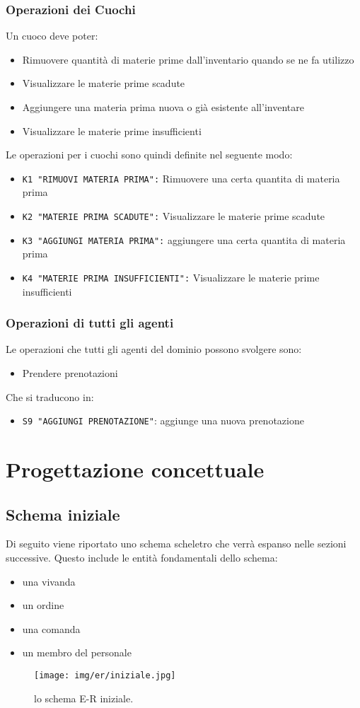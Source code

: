 \documentclass[a4paper,12pt]{report}
\begin{document}
\subsection{Operazioni dei Cuochi}\label{sec:cooks}
Un cuoco deve poter:
%
\begin{itemize}
    \item Rimuovere quantità di materie prime dall'inventario quando se ne fa utilizzo
    \item Visualizzare le materie prime scadute
    \item Aggiungere una materia prima nuova o già esistente all'inventare
    \item Visualizzare le materie prime insufficienti
\end{itemize}
Le operazioni per i cuochi sono quindi definite nel seguente modo:
%
\begin{itemize}
    \item\texttt{K1 "RIMUOVI MATERIA PRIMA":} Rimuovere una certa quantita di materia prima
    \item\texttt{K2 "MATERIE PRIMA SCADUTE":} Visualizzare le materie prime scadute
    \item\texttt{K3 "AGGIUNGI MATERIA PRIMA":} aggiungere una certa quantita di materia prima
    \item\texttt{K4 "MATERIE PRIMA INSUFFICIENTI":} Visualizzare le materie prime insufficienti
\end{itemize}
%
\subsection{Operazioni di tutti gli agenti}\label{sec:everyone_ops}
Le operazioni che tutti gli agenti del dominio possono svolgere sono: 
\begin{itemize}
    \item Prendere prenotazioni
\end{itemize}
Che si traducono in:
\begin{itemize}
    \item \texttt{S9 "AGGIUNGI PRENOTAZIONE"}: aggiunge una nuova prenotazione
\end{itemize}
%
\chapter{Progettazione concettuale}
\section{Schema iniziale}
Di seguito viene riportato uno schema scheletro che verrà espanso nelle sezioni successive. Questo include le entità fondamentali dello schema:
\begin{itemize}
    \item una vivanda
    \item un ordine
    \item una comanda 
    \item un membro del personale
\end{itemize}
%
\begin{figure}[H]
    \centering
    \texttt{[image: img/er/iniziale.jpg]}
    \caption{lo schema E-R iniziale.}
    \label{fig:iniziale-er}
\end{figure}
%
\end{document}
